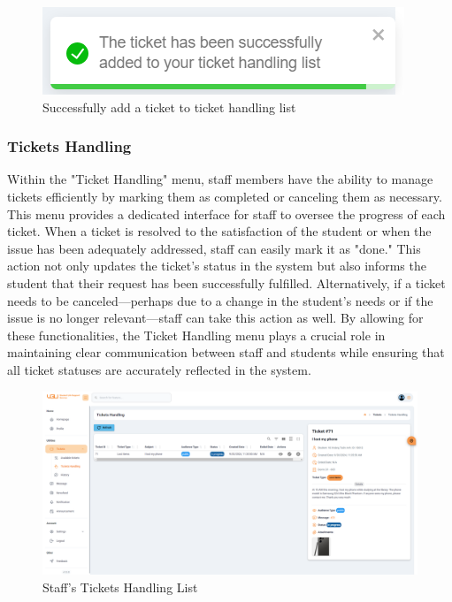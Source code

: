 	
	\begin{figure}[H]
		\centering
		\includegraphics[width=0.5\linewidth]{graphics/gui/staff/avail-ticket-handle-success}
		\caption{Successfully add a ticket to ticket handling list}
		\label{fig:gui-st-avail-ticket-handle-success}
	\end{figure}
	
	
	\subsubsection{Tickets Handling}
	Within the "Ticket Handling" menu, staff members have the ability to manage tickets efficiently by marking them as completed or canceling them as necessary. This menu provides a dedicated interface for staff to oversee the progress of each ticket. When a ticket is resolved to the satisfaction of the student or when the issue has been adequately addressed, staff can easily mark it as "done." This action not only updates the ticket's status in the system but also informs the student that their request has been successfully fulfilled. Alternatively, if a ticket needs to be canceled—perhaps due to a change in the student's needs or if the issue is no longer relevant—staff can take this action as well. By allowing for these functionalities, the Ticket Handling menu plays a crucial role in maintaining clear communication between staff and students while ensuring that all ticket statuses are accurately reflected in the system.
	\begin{figure}[H]
		\centering
		\includegraphics[width=1\linewidth]{graphics/gui/staff/ticket-handling}
		\caption{Staff's Tickets Handling List}
		\label{fig:gui-st-ticket-handling}
	\end{figure}
	
